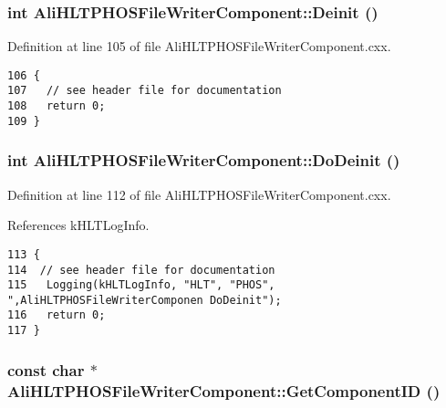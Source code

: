 \subsubsection{\setlength{\rightskip}{0pt plus 5cm}int Ali\-HLTPHOSFile\-Writer\-Component::Deinit ()\hspace{0.3cm}{\tt  [virtual]}}\label{classAliHLTPHOSFileWriterComponent_a3}




Definition at line 105 of file Ali\-HLTPHOSFile\-Writer\-Component.cxx.

\footnotesize\begin{verbatim}106 {
107   // see header file for documentation
108   return 0;
109 }
\end{verbatim}\normalsize 


\subsubsection{\setlength{\rightskip}{0pt plus 5cm}int Ali\-HLTPHOSFile\-Writer\-Component::Do\-Deinit ()\hspace{0.3cm}{\tt  [virtual]}}\label{classAliHLTPHOSFileWriterComponent_a4}




Definition at line 112 of file Ali\-HLTPHOSFile\-Writer\-Component.cxx.

References k\-HLTLog\-Info.

\footnotesize\begin{verbatim}113 {
114  // see header file for documentation
115   Logging(kHLTLogInfo, "HLT", "PHOS", ",AliHLTPHOSFileWriterComponen DoDeinit");
116   return 0;
117 }
\end{verbatim}\normalsize 


\subsubsection{\setlength{\rightskip}{0pt plus 5cm}const char $\ast$ Ali\-HLTPHOSFile\-Writer\-Component::Get\-Component\-ID ()\hspace{0.3cm}{\tt  [virtual]}}\label{classAliHLTPHOSFileWriterComponent_a5}




